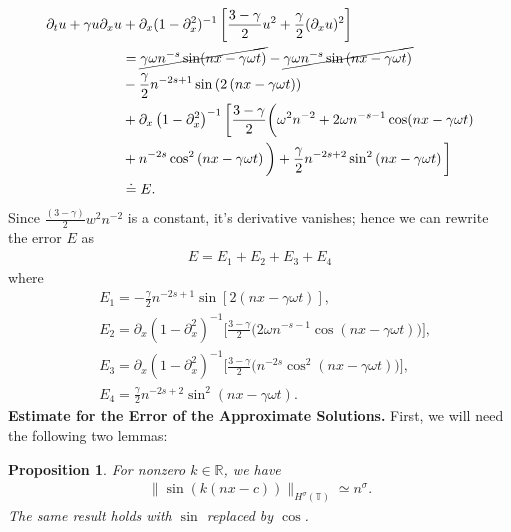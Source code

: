\documentclass[12pt,reqno]{amsart}
\newcommand{\rr}{\mathbb{R}}
\newcommand{\p}{\partial}
\newcommand{\ci}{\mathbb{T}}
\theoremstyle{plain}  %
\newtheorem{proposition}{Proposition}
\theoremstyle{definition}
\begin{document}
	\begin{equation}
		\begin{split}
			\p_t u + \gamma u \p_x u
			& + \p_x(1- \p_x^2)^{-1} \left[
			\frac{3-\gamma}{2}u^2 + \frac{\gamma}{2}(\p_x u)^2 \right]
			\\
			& = \cancel{\gamma \omega n^{-s} \sin(nx - \gamma \omega t)} -
			\cancel{\gamma \omega n^{-s}\sin\left( nx - \gamma \omega t \right)}
			\\
			& -
			\frac{\gamma}{2}n^{-2s+1}\sin\left( 2\left( nx - \gamma \omega t \right)
			\right)
			\\
			& + \p_x \left( 1-\p_x^2 \right)^{-1}\bigg[ \frac{3-\gamma}{2} \bigg (
			\omega^2 n^{-2} + 2 \omega n^{-s -1}\cos( nx - \gamma \omega t )
			\\
			& + n^{-2s}\cos^2\left( nx - \gamma \omega t \right) \bigg ) + \frac{\gamma}{2}
			n^{-2s+2}\sin^2\left( nx - \gamma \omega t \right)
			\bigg]
			\\
			& \doteq E.
			\label{functional-representation-of-error}
		\end{split}
	\end{equation}
	Since $\frac{(3-\gamma)}{2}w^2 n^{-2}$ is a constant, it's derivative vanishes;
	hence we can rewrite the error $E$ as
	\begin{equation}
		\begin{split}
			E= E_1 + E_2 + E_3 + E_4
			\label{57}
		\end{split}
	\end{equation}
	where
	\begin{align}
		\label{90*}
			& E_1 =
			- \frac{\gamma}{2}n^{-2s+1}\sin\left[ 2\left( nx - \gamma 
			\omega t \right)
			\right],
			\\
			\label{90**}
			& E_2 = \p_x \left( 1-\p_x^2 \right)^{-1}\bigg[ \frac{3-\gamma}{2} \bigg (
			2 \omega n^{-s -1}\cos( nx - \gamma \omega t )
			\bigg )
			\bigg ],
			\\
			\label{90***}
			& E_3 = \p_x \left( 1-\p_x^2 \right)^{-1}\bigg[ 
			\frac{3-\gamma}{2} \bigg (
			 n^{-2s}\cos^2\left( nx - \gamma \omega t \right) \bigg )
			\bigg ],
			\\
			& E_4 = \frac{\gamma}{2}
			n^{-2s+2}\sin^2\left( nx - \gamma \omega t \right).
			\label{90}
	\end{align}
%
%
%
\noindent
\vskip0.1in
{\bf  Estimate for the  Error of the Approximate Solutions.}
%
%
First, we will need the following two lemmas:
%
%
%
	 \begin{proposition}
		 \label{1n}
		 For nonzero $k \in \rr$, we have
		 \begin{equation}
			 \begin{split}
				 \|\sin(k(nx-c))\|_{H^\sigma(\ci)} \simeq n^\sigma.
				 \label{1m}
			 \end{split}
		 \end{equation}
		The same result holds with $\sin$ replaced by $\cos$.
	\end{proposition}
\end{document}
